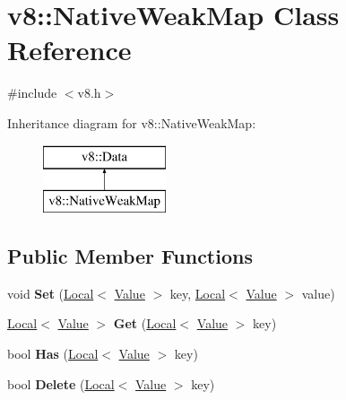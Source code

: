 \hypertarget{classv8_1_1_native_weak_map}{}\section{v8\+:\+:Native\+Weak\+Map Class Reference}
\label{classv8_1_1_native_weak_map}


{\ttfamily \#include $<$v8.\+h$>$}

Inheritance diagram for v8\+:\+:Native\+Weak\+Map\+:\begin{figure}[H]
\begin{center}
\leavevmode
\includegraphics[height=2.000000cm]{classv8_1_1_native_weak_map}
\end{center}
\end{figure}
\subsection*{Public Member Functions}
\begin{DoxyCompactItemize}
\item 
void {\bfseries Set} (\hyperlink{classv8_1_1_local}{Local}$<$ \hyperlink{classv8_1_1_value}{Value} $>$ key, \hyperlink{classv8_1_1_local}{Local}$<$ \hyperlink{classv8_1_1_value}{Value} $>$ value)\hypertarget{classv8_1_1_native_weak_map_ade0e4ce74820a0fcf8b51fb1cea733a7}{}\label{classv8_1_1_native_weak_map_ade0e4ce74820a0fcf8b51fb1cea733a7}

\item 
\hyperlink{classv8_1_1_local}{Local}$<$ \hyperlink{classv8_1_1_value}{Value} $>$ {\bfseries Get} (\hyperlink{classv8_1_1_local}{Local}$<$ \hyperlink{classv8_1_1_value}{Value} $>$ key)\hypertarget{classv8_1_1_native_weak_map_a9350148caa6f09f7c228dda255317387}{}\label{classv8_1_1_native_weak_map_a9350148caa6f09f7c228dda255317387}

\item 
bool {\bfseries Has} (\hyperlink{classv8_1_1_local}{Local}$<$ \hyperlink{classv8_1_1_value}{Value} $>$ key)\hypertarget{classv8_1_1_native_weak_map_a9de62c6399280088c86bb57c3988e7cb}{}\label{classv8_1_1_native_weak_map_a9de62c6399280088c86bb57c3988e7cb}

\item 
bool {\bfseries Delete} (\hyperlink{classv8_1_1_local}{Local}$<$ \hyperlink{classv8_1_1_value}{Value} $>$ key)\hypertarget{classv8_1_1_native_weak_map_ae3c04eaa9e745732f7b2f16c6e75dead}{}\label{classv8_1_1_native_weak_map_ae3c04eaa9e745732f7b2f16c6e75dead}

\end{DoxyCompactItemize}
